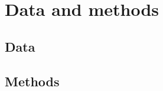 \documentclass[12pt]{article}
\begin{document}
\subsection{}

\section{Data and methods}

\subsection{Data}

\subsection{Methods}

\printbibliography
\end{document}
